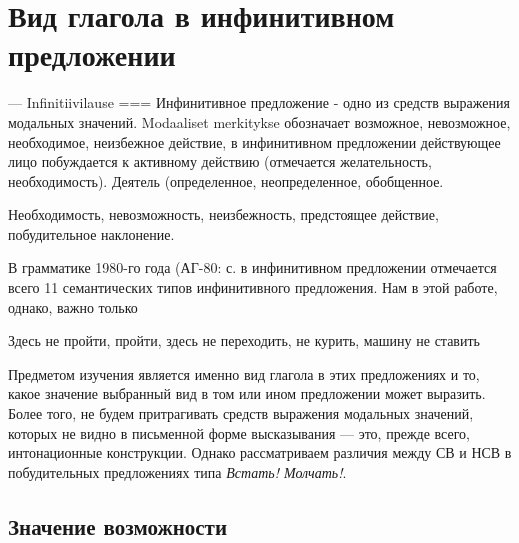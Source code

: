 \section{Вид глагола в инфинитивном предложении}



--- Infinitiivilause === Инфинитивное предложение - одно из средств выражения модальных значений.  Modaaliset merkitykse обозначает возможное, невозможное, необходимое, неизбежное действие, в инфинитивном предложении действующее лицо побуждается к активному действию (отмечается желательность, необходимость). Деятель (определенное, неопределенное, обобщенное.

Необходимость, невозможность, неизбежность, предстоящее действие, побудительное наклонение.

В грамматике 1980-го года (АГ-80: с. в инфинитивном предложении отмечается всего 11 семантических типов инфинитивного предложения. Нам в этой работе, однако, важно только 


Здесь не пройти, пройти, здесь не переходить, не курить, машину не ставить

Предметом изучения является именно вид глагола в этих предложениях и то, какое значение выбранный вид в том или ином предложении может выразить. Более того, не будем притрагивать средств выражения модальных значений, которых не видно в письменной форме высказывания --- это, прежде всего, интонационные конструкции. Однако рассматриваем различия между СВ и НСВ в побудительных предложениях типа \textit{Встать! Молчать!}.






\subsection{Значение возможности}


